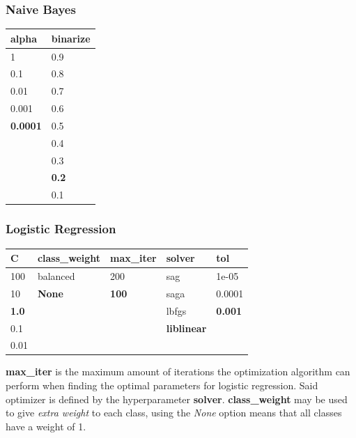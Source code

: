 \documentclass[epsfig,a4paper,11pt,titlepage,twoside,openany]{book}
\begin{document}
\subsubsection{Naive Bayes}

\begin{table}[H]
\centering
\begin{tabular}{l|l}
alpha           & binarize     \\ \hline
1               & 0.9          \\
0.1             & 0.8          \\
0.01            & 0.7          \\
0.001           & 0.6          \\
\textbf{0.0001} & 0.5          \\
                & 0.4          \\
                & 0.3          \\
                & \textbf{0.2} \\
                & 0.1     
\end{tabular}
\end{table}


\subsubsection{Logistic Regression}

\begin{table}[H]
\centering
\begin{tabular}{l|l|l|l|l}
C            & class\_weight & max\_iter    & solver             & tol            \\ \hline
100          & balanced      & 200          & sag                & 1e-05          \\
10           & \textbf{None} & \textbf{100} & saga               & 0.0001         \\
\textbf{1.0} &               &              & lbfgs              & \textbf{0.001} \\
0.1          &               &              & \textbf{liblinear} &                \\
0.01         &               &              &                    & 
\end{tabular}
\end{table}

\textbf{max\_iter} is the maximum amount of iterations the optimization algorithm can perform when finding the optimal parameters for logistic regression. Said optimizer is defined by the hyperparameter \textbf{solver}. \textbf{class\_weight} may be used to give \textit{extra weight} to each class, using the \textit{None} option means that all classes have a weight of 1.
\end{document}
